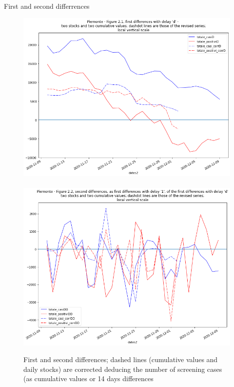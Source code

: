\documentclass[8pt]{beamer}
\begin{document}
\begin{frame}{First and second differrences}

\begin{figure}[H]
\center
\includegraphics[scale=0.2]{d.png}~~~\includegraphics[scale=0.2]{dd.png}

\caption{First and second differences; dashed lines (cumulative values and daily stocks) are corrected deducing the number of screening cases (as cumulative values or 14 days differences} 
\label{comparableCurrent}
\end{figure}

\end{frame}
\end{document}
